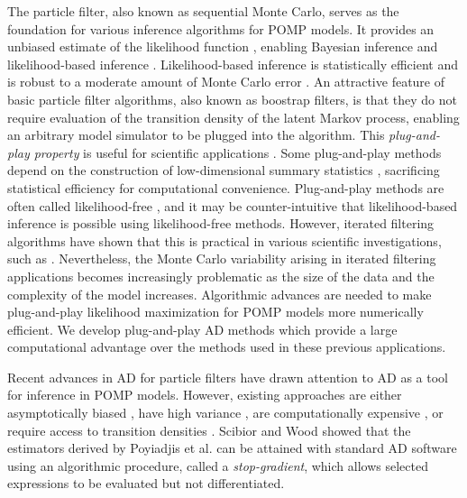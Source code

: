 \documentclass[9pt,twocolumn,pnasresearcharticle]{pnas-new}
\begin{document}
The particle filter, also known as sequential Monte Carlo, serves as the foundation for various inference algorithms for POMP models.
It provides an unbiased estimate of the likelihood function  \cite{delMoral04}, enabling Bayesian inference \cite{andrieu10,chopin13} and likelihood-based inference \cite{ionides06-pnas,ionides15}.
Likelihood-based inference is statistically efficient \cite{pawitan01} and is robust to a moderate amount of Monte Carlo error \cite{ionides17,ning21}.
An attractive feature of basic particle filter algorithms, also known as boostrap filters, is that they do not require evaluation of the transition density of the latent Markov process, enabling an arbitrary model simulator to be plugged into the algorithm.
This \textit{plug-and-play property} is useful for scientific applications \cite{he10}.
Some plug-and-play methods depend on the construction of low-dimensional summary statistics \cite{wood10,toni09}, sacrificing statistical efficiency for computational convenience.
Plug-and-play methods are often called likelihood-free \cite{owen15}, and it may be counter-intuitive that likelihood-based inference is possible using likelihood-free methods. 
However, iterated filtering algorithms have shown that this is practical in various scientific investigations, such as \cite{king08,blake14,pons-salort18,subramanian21,fox22,drake23}.
Nevertheless, the Monte Carlo variability arising in iterated filtering applications becomes increasingly problematic as the size of the data and the complexity of the model increases.
Algorithmic advances are needed to make plug-and-play likelihood maximization for POMP models more numerically efficient.
We develop plug-and-play AD methods which provide a large computational advantage over the methods used in these previous applications.


Recent advances in AD for particle filters \cite{naesseth18, jonschkowski18, corenflos21, scibior21, singh22} have drawn attention to AD as a tool for inference in POMP models.
However, existing approaches are either asymptotically biased \cite{naesseth18, jonschkowski18}, have high variance \cite{poyiadjis11, scibior21}, are computationally expensive \cite{corenflos21, chen24}, or require access to transition densities \cite{poyiadjis11, scibior21, singh22, chen24}. Scibior and Wood \cite{scibior21} showed that the estimators derived by Poyiadjis et al. \cite{poyiadjis11} can be attained with standard AD software using an algorithmic procedure, called a {\it stop-gradient}, which allows selected expressions to be evaluated but not differentiated.
\end{document}
